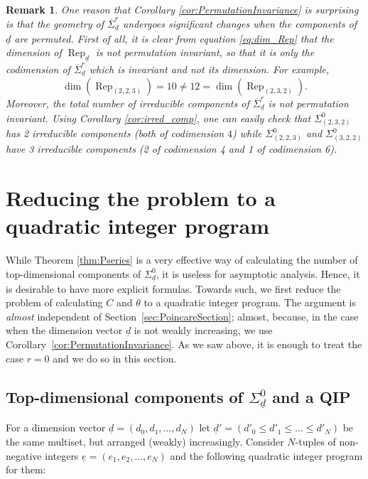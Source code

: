 \documentclass[a4paper]{amsart}
\DeclareMathOperator{\Rep}{\mathrm{Rep}}
\newcommand{\ud}{\underline{d}}
\newcommand{\ue}{\underline{e}}
\newcommand{\cSigma}{\overline{\Sigma}}
\newcommand{\codimnot}{C}
\theoremstyle{plain}
\newtheorem{remark}[thm]{Remark}
\begin{document}
\begin{remark} \rm \label{remark:surprise}
 One reason that Corollary \ref{cor:PermutationInvariance} is surprising is that the geometry of $\cSigma^r_{\ud}$ undergoes significant changes when the components of $\ud$ are permuted. First of all, it is clear from equation \eqref{eq:dim_Rep} that the \emph{dimension} of $\Rep_{\ud}$ is not permutation invariant, so that it is only the codimension of $\cSigma_{\ud}^r$ which is invariant and not its dimension. For example,
 \[
 \dim(\Rep_{(2,2,3)})=10\neq 12=\dim(\Rep_{(2,3,2)}).
 \]
Moreover, the \emph{total number} of irreducible components of $\cSigma_{\ud}^r$ is not permutation invariant. Using Corollary \ref{cor:irred_comp}, one can easily check that $\Sigma_{(2,3,2)}^0$ has 2 irreducible components (both of codimension $4$) while $\Sigma_{(2,2,3)}^0$ and $\Sigma_{(3,2,2)}^0$ have 3 irreducible components (2 of codimension 4 and 1 of codimension 6).
\end{remark}

\section{Reducing the problem to a quadratic integer program}

While Theorem \ref{thm:Pseries} is a very effective way of calculating the number of top-dimensional components of $\Sigma^0_{\ud}$, it is useless for asymptotic analysis. Hence, it is desirable to have more explicit formulas. Towards such, we first reduce the problem of calculating $\codimnot$ and $\theta$ to a quadratic integer program. The argument is {\em almost} independent of Section~\ref{sec:PoincareSection}; almost, because, in the case when the dimension vector $\ud$ is not weakly increasing, we use Corollary~\ref{cor:PermutationInvariance}. As we saw above, it is enough to treat the case $r=0$ and we do so in this section.

\subsection{Top-dimensional components of $\Sigma^0_{\ud}$ and a QIP}
For a dimension vector $\ud=(d_0,d_1,\ldots,d_N)$ let $\ud'=(d'_0\leq d'_1\leq \ldots \leq d'_N)$ be the same multiset, but arranged (weakly) increasingly. Consider $N$-tuples of non-negative integers $\ue=(e_1,e_2,\ldots,e_N)$ and the following quadratic integer program for them:
\end{document}
